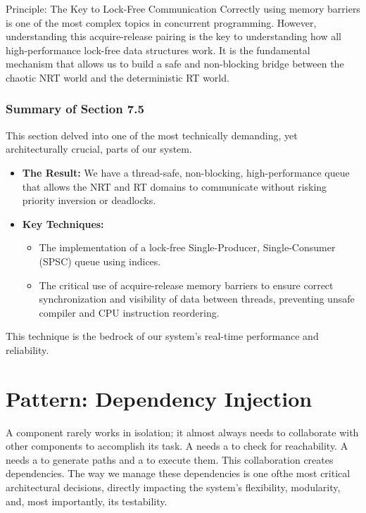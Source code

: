 \begin{principlebox}{Principle: The Key to Lock-Free Communication}
Correctly using memory barriers is one of the most complex topics in concurrent programming. However, understanding this acquire-release pairing is the key to understanding how all high-performance lock-free data structures work. It is the fundamental mechanism that allows us to build a safe and non-blocking bridge between the chaotic NRT world and the deterministic RT world.
\end{principlebox}

\subsubsection{Summary of Section 7.5}
\label{subsubsec:section7_5_summary}
This section delved into one of the most technically demanding, yet architecturally crucial, parts of our system.
\begin{itemize}
    \item \textbf{The Result:} We have a thread-safe, non-blocking, high-performance queue that allows the NRT and RT domains to communicate without risking priority inversion or deadlocks.
    \item \textbf{Key Techniques:}
    \begin{itemize}
        \item The implementation of a lock-free Single-Producer, Single-Consumer (SPSC) queue using  indices.
        \item The critical use of acquire-release memory barriers to ensure correct synchronization and visibility of data between threads, preventing unsafe compiler and CPU instruction reordering.
    \end{itemize}
\end{itemize}
This technique is the bedrock of our system's real-time performance and reliability.



\section{Pattern: Dependency Injection}
\label{sec:pattern_dependency_injection}

A component rarely works in isolation; it almost always needs to collaborate with other components to accomplish its task. A  needs a  to check for reachability. A  needs a  to generate paths and a  to execute them. This collaboration creates dependencies. The way we manage these dependencies is one ofthe most critical architectural decisions, directly impacting the system's flexibility, modularity, and, most importantly, its testability.

